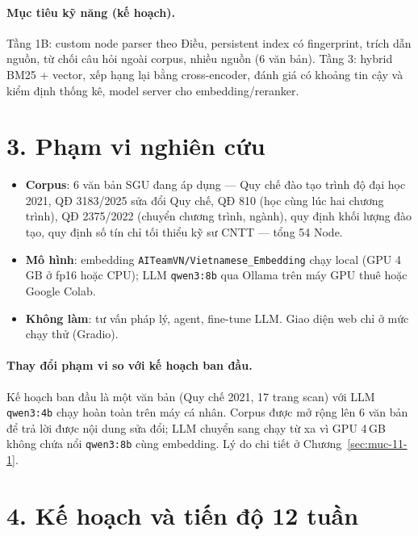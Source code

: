 \paragraph{Mục tiêu kỹ năng (kế hoạch).} Tầng 1B: custom node parser theo Điều, persistent index có
fingerprint, trích dẫn nguồn, từ chối câu hỏi ngoài corpus, nhiều nguồn (6 văn bản). Tầng 3: hybrid
BM25 + vector, xếp hạng lại bằng cross-encoder, đánh giá có khoảng tin cậy và kiểm định thống kê, model
server cho embedding/reranker.

\section*{3. Phạm vi nghiên cứu}

\begin{itemize}
  \item \textbf{Corpus}: 6 văn bản SGU đang áp dụng --- Quy chế đào tạo trình độ đại học 2021, QĐ 3183/2025
        sửa đổi Quy chế, QĐ 810 (học cùng lúc hai chương trình), QĐ 2375/2022 (chuyển chương trình, ngành),
        quy định khối lượng đào tạo, quy định số tín chỉ tối thiểu kỹ sư CNTT --- tổng 54 Node.
  \item \textbf{Mô hình}: embedding \texttt{AITeamVN/Vietnamese\_Embedding} chạy local (GPU 4\,GB ở fp16 hoặc
        CPU); LLM \texttt{qwen3:8b} qua Ollama trên máy GPU thuê hoặc Google Colab.
  \item \textbf{Không làm}: tư vấn pháp lý, agent, fine-tune LLM. Giao diện web chỉ ở mức chạy thử (Gradio).
\end{itemize}

\paragraph{Thay đổi phạm vi so với kế hoạch ban đầu.} Kế hoạch ban đầu là một văn bản (Quy chế 2021, 17
trang scan) với LLM \texttt{qwen3:4b} chạy hoàn toàn trên máy cá nhân. Corpus được mở rộng lên 6 văn bản
để trả lời được nội dung sửa đổi; LLM chuyển sang chạy từ xa vì GPU 4\,GB không chứa nổi
\texttt{qwen3:8b} cùng embedding. Lý do chi tiết ở Chương~\ref{sec:muc-11-1}.

\section*{4. Kế hoạch và tiến độ 12 tuần}

